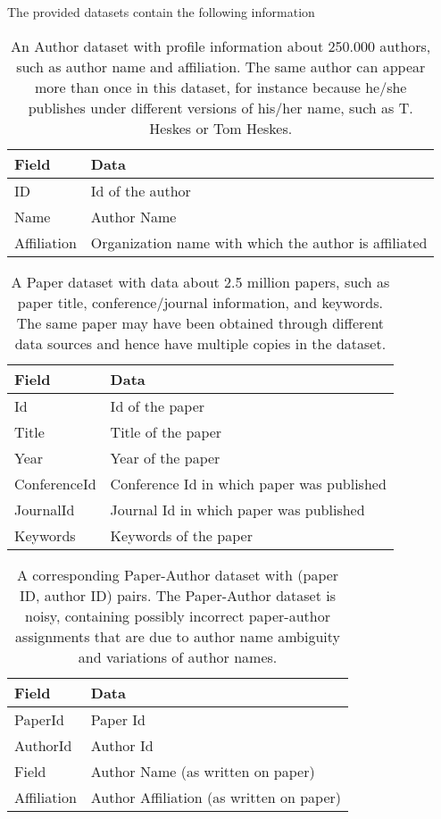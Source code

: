 The provided datasets contain the following information


\clearpage

\begin{table}
\begin{tabular}{| l | p{8cm} |} \hline
\textbf{Field} & \textbf{Data} \\ \hline
ID & Id of the author \\ \hline
Name & Author Name \\ \hline
Affiliation & Organization name with which the author is affiliated \\ \hline
\end{tabular}

\caption{An Author dataset with profile information about 250.000 authors, such as author name and affiliation. The same author can appear more than once in this dataset, for instance because he/she publishes under different versions of his/her name, such as T. Heskes or Tom Heskes.}
\end{table}

\begin{table}
\begin{tabular}{| l | p{8cm} |} \hline
\textbf{Field} & \textbf{Data} \\ \hline
Id &  Id of the paper \\ \hline
Title & Title of the paper \\ \hline
Year & Year of the paper \\ \hline
ConferenceId & Conference Id in which paper was published \\ \hline
JournalId & Journal Id in which paper was published \\ \hline
Keywords &  Keywords of the paper \\\hline
\end{tabular}
\caption{A Paper dataset with data about 2.5 million papers, such as paper title, conference/journal information, and keywords. The same paper may have been obtained through different data sources and hence have multiple copies in the dataset.}
\end{table}

\begin{table}
\begin{tabular}{| l | p{8cm} |} \hline
\textbf{Field} & \textbf{Data} \\ \hline
PaperId & Paper Id \\ \hline
AuthorId & Author Id \\ \hline
Field  &  Author Name (as written on paper) \\ \hline
Affiliation  & Author Affiliation (as written on paper) \\ \hline
\end{tabular}
\caption{A corresponding Paper-Author dataset with (paper ID, author ID) pairs. The Paper-Author dataset is noisy, containing possibly incorrect paper-author assignments that are due to author name ambiguity and variations of author names.}
\end{table}

